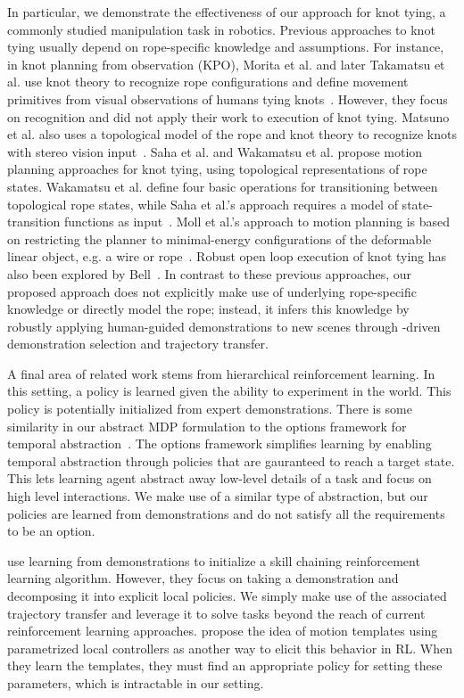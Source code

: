 In particular, we demonstrate the effectiveness of our approach for
knot tying, a commonly studied manipulation task in robotics.
Previous approaches to knot tying usually depend on rope-specific knowledge
and assumptions.
For instance, in knot planning from observation (KPO), Morita et al. and later
Takamatsu et al. use knot theory to recognize rope configurations and define
movement primitives from visual observations of humans tying
knots~\cite{Morita_ICRA2003, Takamatsu_TransRob2006}. However, they focus on
recognition and did not apply their work to execution of knot tying. Matsuno et al.
also uses a topological model of the rope and knot theory to recognize knots with
stereo vision input~\cite{Matsuno_RSJ2006}.
Saha et al. and Wakamatsu et al. propose motion planning approaches for knot tying,
using topological representations of rope states. Wakamatsu et al. define four basic operations for
transitioning between topological rope states,
while Saha et al.'s approach requires a model of state-transition functions
as input~\cite{Saha_ExpRobotics2008, Wakamatsu_IJRR2006}. Moll et al.'s approach
to motion planning is based on restricting the planner to minimal-energy
configurations of the deformable linear object, e.g. a wire or rope~\cite{Moll_IEEERobot2006}.
Robust open loop execution of knot tying has also been explored by Bell~\cite{Bell_PhD2010}.
In contrast to these previous approaches, our proposed approach does not
explicitly make use of underlying rope-specific
knowledge or directly model the rope; instead, it infers this knowledge by
robustly applying human-guided demonstrations to new scenes through
\mmql{}-driven demonstration selection and trajectory transfer.



A final area of related work stems from hierarchical reinforcement learning. 
In this setting, a policy is learned given the ability to experiment in the world.
This policy is potentially initialized from expert demonstrations.
There is some similarity in our abstract MDP formulation to the options 
framework for temporal abstraction~\cite{sutton1999between}.
The options framework simplifies learning by enabling temporal abstraction through
policies that are gauranteed to reach a target state. 
This lets learning agent abstract away low-level details of a task and focus on 
high level interactions. 
We make use of a similar type of abstraction, but our policies are learned from 
demonstrations and do not satisfy all the requirements to be an option.

\citet{konidaris2010constructing} use learning from demonstrations to initialize a skill chaining reinforcement learning algorithm.
However, they focus on taking a demonstration and decomposing it into explicit local policies.
We simply make use of the associated trajectory transfer and leverage it to solve tasks beyond the reach of current reinforcement learning approaches.
\citet{Neumann09learningcomplex} propose the idea of motion templates using parametrized local controllers as another way to elicit this behavior in RL.
When they learn the templates, they must find an appropriate policy for setting these parameters, which is intractable in our setting.
